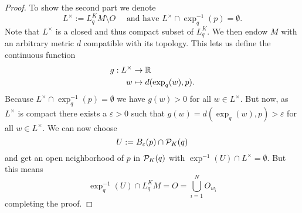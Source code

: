 \begin{proof}
    To show the second part we denote
    \[
        L^\times := L^K_qM \setminus O \quad \text{ and have } L^\times \cap \exp^{-1}_q(p) = \emptyset.
    \]
    Note that $L^\times$ is a closed and thus compact subset of $L^K_q$. We then endow $M$ with an arbitrary metric $d$ compatible with its topology. 
    This lets us define the continuous function 
    \begin{align*}
        g:L^\times &\to \mathbb{R}\\
        w &\mapsto d(\exp_q(w),p).
    \end{align*}
    Because $L^\times \cap \exp^{-1}_q(p) = \emptyset$ we have $g(w)>0$ for all $w\in L^\times$. But now, as $L^\times$ is compact there exists a $\varepsilon>0$ such that $g(w)=d(\exp_q(w),p)>\varepsilon$ for all $w\in L^\times$. We can now choose
    \[
        U := B_\varepsilon(p) \cap \mathcal{P}_K(q)
    \] and get an open neighborhood of $p$ in $\mathcal{P}_K(q)$ with $\exp^{-1}(U)\cap L^\times = \emptyset$. But this means 
    \[
        \exp^{-1}_q(U) \cap L^K_qM = O = \bigcup_{i=1}^N O_{w_i}
    \]
    completing the proof.

    \newpage
\end{proof}



